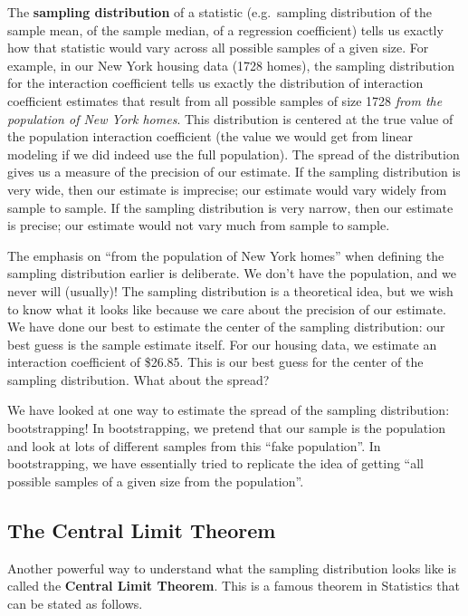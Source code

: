 \documentclass[
]{book}
\begin{document}
The \textbf{sampling distribution} of a statistic (e.g.~sampling distribution of the sample mean, of the sample median, of a regression coefficient) tells us exactly how that statistic would vary across all possible samples of a given size. For example, in our New York housing data (1728 homes), the sampling distribution for the interaction coefficient tells us exactly the distribution of interaction coefficient estimates that result from all possible samples of size 1728 \emph{from the population of New York homes}. This distribution is centered at the true value of the population interaction coefficient (the value we would get from linear modeling if we did indeed use the full population). The spread of the distribution gives us a measure of the precision of our estimate. If the sampling distribution is very wide, then our estimate is imprecise; our estimate would vary widely from sample to sample. If the sampling distribution is very narrow, then our estimate is precise; our estimate would not vary much from sample to sample.

The emphasis on ``from the population of New York homes'' when defining the sampling distribution earlier is deliberate. We don't have the population, and we never will (usually)! The sampling distribution is a theoretical idea, but we wish to know what it looks like because we care about the precision of our estimate. We have done our best to estimate the center of the sampling distribution: our best guess is the sample estimate itself. For our housing data, we estimate an interaction coefficient of \$26.85. This is our best guess for the center of the sampling distribution. What about the spread?

We have looked at one way to estimate the spread of the sampling distribution: bootstrapping! In bootstrapping, we pretend that our sample is the population and look at lots of different samples from this ``fake population''. In bootstrapping, we have essentially tried to replicate the idea of getting ``all possible samples of a given size from the population''.

\subsection{The Central Limit Theorem}\label{the-central-limit-theorem}

Another powerful way to understand what the sampling distribution looks like is called the \textbf{Central Limit Theorem}. This is a famous theorem in Statistics that can be stated as follows.
\end{document}
